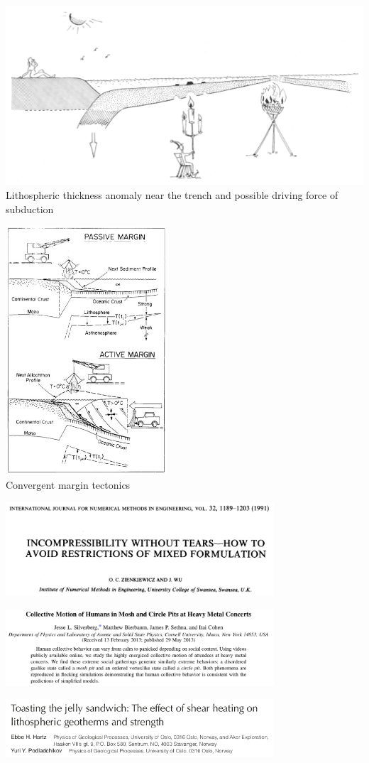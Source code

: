 \vspace{1cm}

\begin{center}
\includegraphics[width=14cm]{images/interesting/futo85}\\
{\tiny Lithospheric thickness anomaly near the trench and possible driving force of subduction \cite{futo85}}
\end{center}

\vspace{1cm}

\begin{center}
\includegraphics[width=6cm]{images/interesting/stbb86}\\
{\tiny Convergent margin tectonics \cite{stbb86}}
\end{center}


\includegraphics[width=10cm]{images/interesting/ziwu91} {\tiny \cite{ziwu91}}

\includegraphics[width=10cm]{images/interesting/sibs13} {\tiny \cite{sibs13}}

\includegraphics[width=10cm]{images/interesting/hapo08} {\tiny \cite{hapo08}}
